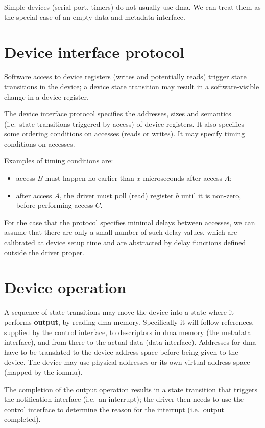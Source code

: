 \documentclass[a4paper,12pt]{report}
\begin{document}
Simple devices (serial port, timers) do not usually use \gls{dma}. We can treat them
as the special case of an empty data and metadata interface.

\section{Device interface protocol}\label{s:dev_proto}

Software access to device registers (writes and potentially reads)
trigger state transitions in the device; a device state transition may
result in a software-visible change in a device register.

The device interface protocol specifies the addresses, sizes and
semantics (i.e.\ state transitions triggered by access) of device
registers. It also specifies some ordering conditions on accesses
(reads or writes). It
may specify timing conditions on accesses.

Examples of timing conditions are:
\begin{itemize}
\item  access \(B\) must happen no earlier than \(x\) microseconds after
  access \(A\);
\item after access \(A\), the driver must poll (read) register \(b\) until it
  is non-zero, before performing access \(C\).
\end{itemize}

For the case that the protocol specifies minimal delays between
accesses, we can assume that there are only a small number of such
delay values, which are calibrated at device setup time and are
abstracted by delay functions defined outside the driver proper.

\section{Device operation}

A sequence of state transitions may move the device into a state
where it performs \textbf{output}, by reading \gls{dma} memory. Specifically it will
follow references, supplied by the control interface, to descriptors
in \gls{dma} memory (the metadata interface), and from there to the actual
data (data interface). Addresses for \gls{dma} have to be translated to the
device address space before being given to the device. The device may
use physical addresses or its own virtual address space (mapped by the \gls{iommu}).

The completion of the output operation
results in a state transition that triggers the notification interface
(i.e.\ an interrupt); the driver then needs to use the control
interface to determine the reason for the interrupt (i.e.\ output
completed).
\end{document}
